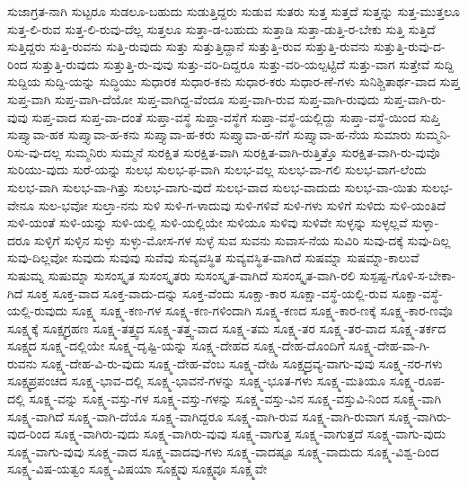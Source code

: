 {ಸುಜಾಗ್ರತ-ನಾಗಿ
ಸುಟ್ಟರೂ
ಸುಡಲೂ-ಬಹುದು
ಸುಡುತ್ತಿದ್ದರು
ಸುಡುವ
ಸುತರು
ಸುತ್ತ
ಸುತ್ತದೆ
ಸುತ್ತನ್ನು
ಸುತ್ತ-ಮುತ್ತಲೂ
ಸುತ್ತ-ಲಿ-ರುವ
ಸುತ್ತ-ಲಿ-ರುವು-ದೆಲ್ಲ
ಸುತ್ತಲೂ
ಸುತ್ತಾ-ಡ-ಬಹುದು
ಸುತ್ತಾಡಿ
ಸುತ್ತಾ-ಡುತ್ತಿ-ರ-ಬೇಕು
ಸುತ್ತಿ
ಸುತ್ತಿದೆ
ಸುತ್ತಿದ್ದರು
ಸುತ್ತಿ-ರುವನು
ಸುತ್ತಿ-ರುವುದು
ಸುತ್ತು
ಸುತ್ತುತ್ತಿದ್ದಾನೆ
ಸುತ್ತುತ್ತಿ-ರುವ
ಸುತ್ತುತ್ತಿ-ರುವನು
ಸುತ್ತುತ್ತಿ-ರುವು-ದ-ರಿಂದ
ಸುತ್ತುತ್ತಿ-ರುವುದು
ಸುತ್ತುತ್ತಿ-ರು-ವುವು
ಸುತ್ತು-ವರಿ-ದಿದ್ದರೂ
ಸುತ್ತು-ವರಿ-ಯಲ್ಪಟ್ಟಿದೆ
ಸುತ್ತು-ವಾಗ
ಸುತ್ತೇವೆ
ಸುದ್ದಿ
ಸುದ್ದಿಯ
ಸುದ್ದಿ-ಯನ್ನು
ಸುದ್ಧಿಯು
ಸುಧಾರಕ
ಸುಧಾರ-ಕನು
ಸುಧಾರ-ಕರು
ಸುಧಾರ-ಣೆ-ಗಳು
ಸುನಿಶ್ಚಿತಾರ್ಥ-ವಾದ
ಸುಪ್ತ
ಸುಪ್ತ-ವಾಗಿ
ಸುಪ್ತ-ವಾಗಿ-ದೆಯೋ
ಸುಪ್ತ-ವಾಗಿದ್ದ-ವೆಂದೂ
ಸುಪ್ತ-ವಾಗಿ-ರುವ
ಸುಪ್ತ-ವಾಗಿ-ರುವುದು
ಸುಪ್ತ-ವಾಗಿ-ರು-ವುವು
ಸುಪ್ತ-ವಾದ
ಸುಪ್ತ-ವಾ-ದಂತೆ
ಸುಪ್ತಾ-ವಸ್ಥೆ
ಸುಪ್ತಾ-ವಸ್ಥೆಗೆ
ಸುಪ್ತಾ-ವಸ್ಥೆ-ಯಲ್ಲಿದ್ದು
ಸುಪ್ತಾ-ವಸ್ಥೆ-ಯಿಂದ
ಸುಪ್ತಿ
ಸುಪ್ತ್ಯಾವಾ-ಹಕ
ಸುಪ್ತ್ಯಾವಾ-ಹ-ಕನು
ಸುಪ್ತ್ಯಾವಾ-ಹ-ಕರು
ಸುಪ್ತ್ಯಾವಾ-ಹ-ನೆಗೆ
ಸುಪ್ತ್ಯಾವಾ-ಹ-ನೆಯ
ಸುಮಾರು
ಸುಮ್ಮನಿ-ರಿಸು-ವು-ದಲ್ಲ
ಸುಮ್ಮನಿರು
ಸುಮ್ಮನೆ
ಸುರಕ್ಷಿತ
ಸುರಕ್ಷಿತ-ವಾಗಿ
ಸುರಕ್ಷಿತ-ವಾಗಿ-ರುತ್ತಿತ್ತೊ
ಸುರಕ್ಷಿತ-ವಾಗಿ-ರು-ವುವೊ
ಸುರಿಯು-ವುದು
ಸುರೆ-ಯನ್ನು
ಸುಲಭ
ಸುಲಭ-ಫ-ವಾಗಿ
ಸುಲಭ-ವಲ್ಲ
ಸುಲಭ-ವಾ-ಗಲಿ
ಸುಲಭ-ವಾಗ-ಲೆಂದು
ಸುಲಭ-ವಾಗಿ
ಸುಲಭ-ವಾ-ಗಿತ್ತು
ಸುಲಭ-ವಾಗು-ವುದೆ
ಸುಲಭ-ವಾದ
ಸುಲಭ-ವಾದುದು
ಸುಲಭ-ವಾ-ಯಿತು
ಸುಲಭ-ವೇನೂ
ಸುಲ-ಭವೋ
ಸುಲ್ತಾ-ನನು
ಸುಳಿ
ಸುಳಿ-ಗ-ಳಾದುವು
ಸುಳಿ-ಗಳಿವೆ
ಸುಳಿ-ಗಳು
ಸುಳಿಗೆ
ಸುಳಿದು
ಸುಳಿ-ಯಂತಿದೆ
ಸುಳಿ-ಯಂತೆ
ಸುಳಿ-ಯನ್ನು
ಸುಳಿ-ಯಲ್ಲಿ
ಸುಳಿ-ಯಲ್ಲಿಯೇ
ಸುಳಿಯೂ
ಸುಳಿವು
ಸುಳಿವೇ
ಸುಳ್ಳನ್ನು
ಸುಳ್ಳಲ್ಲವೆ
ಸುಳ್ಳಾ-ದರೂ
ಸುಳ್ಳಿಗೆ
ಸುಳ್ಳಿನ
ಸುಳ್ಳು
ಸುಳ್ಳು-ಮೋಸ-ಗಳ
ಸುಳ್ಳೆ
ಸುವ
ಸುವನು
ಸುವಾಸ-ನೆಯ
ಸುವಿರಿ
ಸುವು-ದಕ್ಕೆ
ಸುವು-ದಿಲ್ಲ
ಸುವು-ದಿಲ್ಲವೋ
ಸುವುದು
ಸುವುವು
ಸುವೆವು
ಸುವ್ಯವಸ್ಥಿತ
ಸುವ್ಯವಸ್ಥಿತ-ವಾಗಿದೆ
ಸುಷಮ್ನಾ
ಸುಷಮ್ನಾ-ಕಾಲುವೆ
ಸುಷುಮ್ನ
ಸುಷುಮ್ನಾ
ಸುಸಂಸ್ಕೃತ
ಸುಸಂಸ್ಕೃತರು
ಸುಸಂಸ್ಕೃತ-ವಾಗಿದೆ
ಸುಸಂಸ್ಕೃತ-ವಾಗಿ-ರಲಿ
ಸುಸ್ಪಷ್ಟ-ಗೊಳಿ-ಸ-ಬೇಕಾ-ಗಿದೆ
ಸೂಕ್ತ
ಸೂಕ್ತ-ವಾದ
ಸೂಕ್ತ-ವಾದು-ದನ್ನು
ಸೂಕ್ತ-ವೆಂದು
ಸೂಕ್ಷಾ-ಕಾರ
ಸೂಕ್ಷಾ-ವಸ್ಥೆ-ಯಲ್ಲಿ-ರುವ
ಸೂಕ್ಷಾ-ವಸ್ಥೆ-ಯಲ್ಲಿ-ರುವುದು
ಸೂಕ್ಷ್ಮ
ಸೂಕ್ಷ್ಮ-ಕಣ-ಗಳ
ಸೂಕ್ಷ್ಮ-ಕಣ-ಗಳಿಂದಾಗಿ
ಸೂಕ್ಷ್ಮ-ಕಣದ
ಸೂಕ್ಷ್ಮ-ಕಾರ-ಣಕ್ಕೆ
ಸೂಕ್ಷ್ಮ-ಕಾರ-ಣವೊ
ಸೂಕ್ಷ್ಮಕ್ಕೆ
ಸೂಕ್ಷ್ಮಗ್ರಹಣ
ಸೂಕ್ಷ್ಮ-ತತ್ತ್ವದ
ಸೂಕ್ಷ್ಮ-ತತ್ತ್ವ-ವಾದ
ಸೂಕ್ಷ್ಮ-ತಮ
ಸೂಕ್ಷ್ಮ-ತರ
ಸೂಕ್ಷ್ಮ-ತರ-ವಾದ
ಸೂಕ್ಷ್ಮ-ತರ್ಕದ
ಸೂಕ್ಷ್ಮದ
ಸೂಕ್ಷ್ಮ-ದಲ್ಲಿಯೇ
ಸೂಕ್ಷ್ಮ-ದೃಷ್ಟಿ-ಯನ್ನು
ಸೂಕ್ಷ್ಮ-ದೇಹದ
ಸೂಕ್ಷ್ಮ-ದೇಹ-ದೊಂದಿಗೆ
ಸೂಕ್ಷ್ಮ-ದೇಹ-ವಾ-ಗಿ-ರುವನು
ಸೂಕ್ಷ್ಮ-ದೇಹ-ವಿ-ರು-ವುದು
ಸೂಕ್ಷ್ಮ-ದೇಹ-ವೆಂಬ
ಸೂಕ್ಷ್ಮ-ದೇಹಿ
ಸೂಕ್ಷ್ಮದ್ರವ್ಯ-ವಾಗು-ವುವು
ಸೂಕ್ಷ್ಮ-ನರ-ಗಳು
ಸೂಕ್ಷ್ಮಪ್ರಪಂಚದ
ಸೂಕ್ಷ್ಮ-ಭಾವ-ದಲ್ಲಿ
ಸೂಕ್ಷ್ಮ-ಭಾವನೆ-ಗಳನ್ನು
ಸೂಕ್ಷ್ಮ-ಭೂತ-ಗಳು
ಸೂಕ್ಷ್ಮ-ಮತಿಯೂ
ಸೂಕ್ಷ್ಮ-ರೂಪ-ದಲ್ಲಿ
ಸೂಕ್ಷ್ಮ-ವನ್ನು
ಸೂಕ್ಷ್ಮ-ವಸ್ತು-ಗಳ
ಸೂಕ್ಷ್ಮ-ವಸ್ತು-ಗಳನ್ನು
ಸೂಕ್ಷ್ಮ-ವಸ್ತು-ವಿನ
ಸೂಕ್ಷ್ಮ-ವಸ್ತುವಿ-ನಿಂದ
ಸೂಕ್ಷ್ಮ-ವಾಗಿ
ಸೂಕ್ಷ್ಮ-ವಾಗಿದೆ
ಸೂಕ್ಷ್ಮ-ವಾಗಿ-ದೆಯೊ
ಸೂಕ್ಷ್ಮ-ವಾಗಿದ್ದರೂ
ಸೂಕ್ಷ್ಮ-ವಾಗಿ-ರುವ
ಸೂಕ್ಷ್ಮ-ವಾಗಿ-ರುವಾಗ
ಸೂಕ್ಷ್ಮ-ವಾಗಿರು-ವುದ-ರಿಂದ
ಸೂಕ್ಷ್ಮ-ವಾಗಿರು-ವುದು
ಸೂಕ್ಷ್ಮ-ವಾಗಿರು-ವುವು
ಸೂಕ್ಷ್ಮ-ವಾಗುತ್ತ
ಸೂಕ್ಷ್ಮ-ವಾಗುತ್ತದೆ
ಸೂಕ್ಷ್ಮ-ವಾಗು-ವುದು
ಸೂಕ್ಷ್ಮ-ವಾಗು-ವುವು
ಸೂಕ್ಷ್ಮ-ವಾದ
ಸೂಕ್ಷ್ಮ-ವಾದವು-ಗಳು
ಸೂಕ್ಷ್ಮ-ವಾದಷ್ಟೂ
ಸೂಕ್ಷ್ಮ-ವಾದುದು
ಸೂಕ್ಷ್ಮ-ವಿಶ್ವ-ದಿಂದ
ಸೂಕ್ಷ್ಮ-ವಿಷ-ಯತ್ವಂ
ಸೂಕ್ಷ್ಮ-ವಿಷಯಾ
ಸೂಕ್ಷ್ಮವು
ಸೂಕ್ಷ್ಮವೂ
ಸೂಕ್ಷ್ಮವೇ
}

